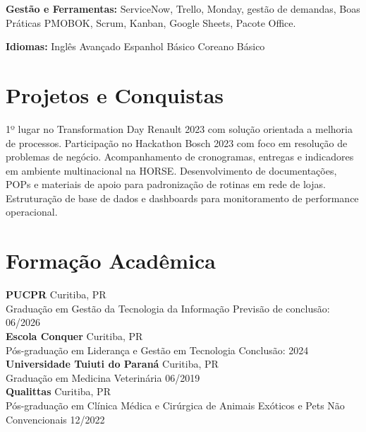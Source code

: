 \documentclass[11pt,a4paper]{article}
\begin{document}
\textbf{Gestão e Ferramentas:} ServiceNow, Trello, Monday, gestão de demandas, Boas Práticas PMOBOK, Scrum, Kanban, Google Sheets, Pacote Office.

\textbf{Idiomas:} Inglês Avançado \enspace\textbullet\enspace Espanhol Básico \enspace\textbullet\enspace Coreano Básico

\section{Projetos e Conquistas}

1º lugar no Transformation Day Renault 2023 com solução orientada a melhoria de processos. Participação no Hackathon Bosch 2023 com foco em resolução de problemas de negócio. Acompanhamento de cronogramas, entregas e indicadores em ambiente multinacional na HORSE. Desenvolvimento de documentações, POPs e materiais de apoio para padronização de rotinas em rede de lojas. Estruturação de base de dados e dashboards para monitoramento de performance operacional.

\section{Formação Acadêmica}

\textbf{PUCPR} \hfill Curitiba, PR\\
Graduação em Gestão da Tecnologia da Informação \hfill Previsão de conclusão: 06/2026\\[6pt]

\textbf{Escola Conquer} \hfill Curitiba, PR\\
Pós-graduação em Liderança e Gestão em Tecnologia \hfill Conclusão: 2024\\[6pt]

\textbf{Universidade Tuiuti do Paraná} \hfill Curitiba, PR\\
Graduação em Medicina Veterinária \hfill 06/2019\\[6pt]

\textbf{Qualittas} \hfill Curitiba, PR\\
Pós-graduação em Clínica Médica e Cirúrgica de Animais Exóticos e Pets Não Convencionais \hfill 12/2022
\end{document}

